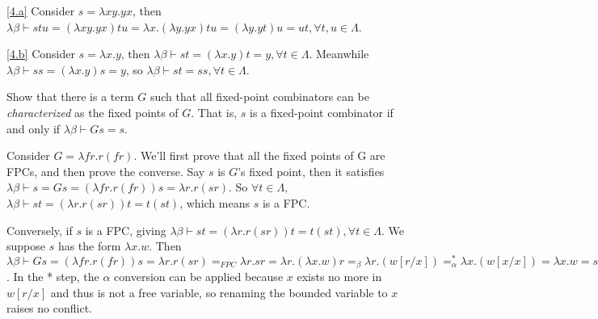 \documentclass{homework}
\begin{document}
\begin{solution}
  \ref{4.a}
  Consider $s = \lambda xy.yx$, then $\lambda\beta \vdash stu = (\lambda xy.yx)tu = \lambda x.(\lambda y.yx)tu = (\lambda y.yt)u = ut, \forall t,u\in \Lambda$. 
  
  \ref{4.b}
  Consider $s = \lambda x.y$, then $\lambda\beta \vdash st = (\lambda x.y)t = y, \forall t\in \Lambda$. Meanwhile $\lambda\beta \vdash ss = (\lambda x.y)s = y$, so $\lambda\beta \vdash st = ss, \forall t\in \Lambda$.
\end{solution}

\begin{problem}
  Show that there is a term $G$ such that all fixed-point combinators can be
  \emph{characterized} as the fixed points of $G$.
  That is, $s$ is a fixed-point combinator if and only if
  $\lambda\beta \vdash G s = s$.
\end{problem}

\begin{solution}
  Consider $G = \lambda fr.r(fr)$. We'll first prove that all the fixed points of G are FPCs, and then prove the converse.
  Say $s$ is $G$'s fixed point, then it satisfies $\lambda\beta \vdash s = Gs = (\lambda fr.r(fr))s = \lambda r.r(sr)$. So $\forall t\in\Lambda$, $\lambda\beta \vdash st = (\lambda r.r(sr))t = t(st)$, which means $s$ is a FPC.
  
  Conversely, if $s$ is a FPC, giving $\lambda\beta \vdash st = (\lambda r.r(sr))t = t(st), \forall t\in \Lambda$. We suppose $s$ has the form $\lambda x.w$. Then $\lambda\beta \vdash Gs = (\lambda fr.r(fr))s = \lambda r.r(sr) =_{FPC} \lambda r.sr = \lambda r.(\lambda x.w)r =_\beta \lambda r.(w[r/x]) =_\alpha^* \lambda x.(w[x/x]) = \lambda x.w = s$. In the * step, the $\alpha$ conversion can be applied because $x$ exists no more in $w[r/x]$ and thus is not a free variable, so renaming the bounded variable to $x$ raises no conflict.
\end{solution}
\end{document}
